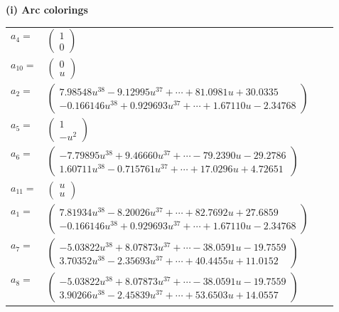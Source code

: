\documentclass[1p]{elsarticle_modified}
\theoremstyle{definition}
\begin{document}
\flushleft \textbf{(i) Arc colorings}\\
\begin{tabular}{m{7pt} m{180pt} m{7pt} m{180pt} }
\flushright $a_{4}=$&$\begin{pmatrix}1\\0\end{pmatrix}$ \\
\flushright $a_{10}=$&$\begin{pmatrix}0\\u\end{pmatrix}$ \\
\flushright $a_{2}=$&$\begin{pmatrix}7.98548 u^{38}-9.12995 u^{37}+\cdots+81.0981 u+30.0335\\-0.166146 u^{38}+0.929693 u^{37}+\cdots+1.67110 u-2.34768\end{pmatrix}$ \\
\flushright $a_{5}=$&$\begin{pmatrix}1\\- u^2\end{pmatrix}$ \\
\flushright $a_{6}=$&$\begin{pmatrix}-7.79895 u^{38}+9.46660 u^{37}+\cdots-79.2390 u-29.2786\\1.60711 u^{38}-0.715761 u^{37}+\cdots+17.0296 u+4.72651\end{pmatrix}$ \\
\flushright $a_{11}=$&$\begin{pmatrix}u\\u\end{pmatrix}$ \\
\flushright $a_{1}=$&$\begin{pmatrix}7.81934 u^{38}-8.20026 u^{37}+\cdots+82.7692 u+27.6859\\-0.166146 u^{38}+0.929693 u^{37}+\cdots+1.67110 u-2.34768\end{pmatrix}$ \\
\flushright $a_{7}=$&$\begin{pmatrix}-5.03822 u^{38}+8.07873 u^{37}+\cdots-38.0591 u-19.7559\\3.70352 u^{38}-2.35693 u^{37}+\cdots+40.4455 u+11.0152\end{pmatrix}$ \\
\flushright $a_{8}=$&$\begin{pmatrix}-5.03822 u^{38}+8.07873 u^{37}+\cdots-38.0591 u-19.7559\\3.90266 u^{38}-2.45839 u^{37}+\cdots+53.6503 u+14.0557\end{pmatrix}$ \\

\end{tabular}
\end{document}
